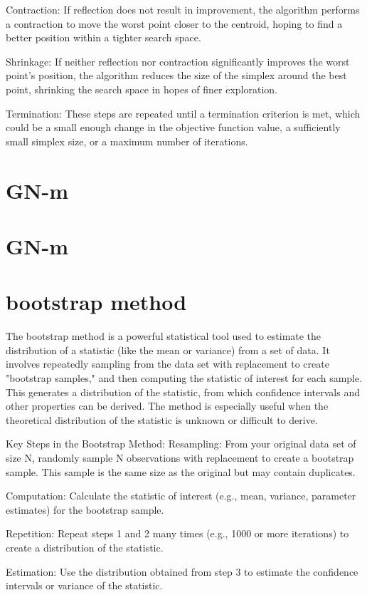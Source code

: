 \documentclass[17pt]{extarticle} %
\begin{document}
Contraction: If reflection does not result in improvement, the algorithm performs a contraction to move the worst point closer to the centroid, hoping to find a better position within a tighter search space.

Shrinkage: If neither reflection nor contraction significantly improves the worst point's position, the algorithm reduces the size of the simplex around the best point, shrinking the search space in hopes of finer exploration.

Termination: These steps are repeated until a termination criterion is met, which could be a small enough change in the objective function value, a sufficiently small simplex size, or a maximum number of iterations.
\section*{GN-m}
\section*{GN-m}


\section*{bootstrap method}

The bootstrap method is a powerful statistical tool used to estimate the distribution of a statistic (like the mean or variance) from a set of data. It involves repeatedly sampling from the data set with replacement to create "bootstrap samples," and then computing the statistic of interest for each sample. This generates a distribution of the statistic, from which confidence intervals and other properties can be derived. The method is especially useful when the theoretical distribution of the statistic is unknown or difficult to derive.

Key Steps in the Bootstrap Method:
Resampling: From your original data set of size
N, randomly sample 
N observations with replacement to create a bootstrap sample. This sample is the same size as the original but may contain duplicates.

Computation: Calculate the statistic of interest (e.g., mean, variance, parameter estimates) for the bootstrap sample.

Repetition: Repeat steps 1 and 2 many times (e.g., 1000 or more iterations) to create a distribution of the statistic.

Estimation: Use the distribution obtained from step 3 to estimate the confidence intervals or variance of the statistic.
\end{document}
